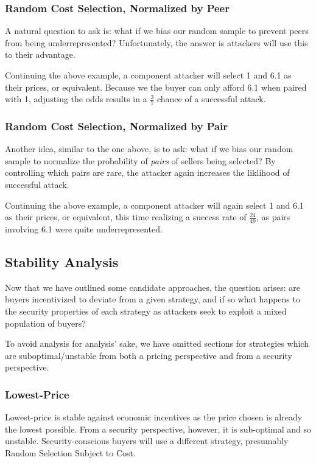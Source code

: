 \subsubsection{Random Cost Selection, Normalized by Peer}

A natural question to ask is: what if we bias our random sample to
prevent peers from being underrepresented? Unfortunately, the answer
is attackers will use this to their advantage.

Continuing the above example, a component attacker will select 1 and
6.1 as their prices, or equivalent. Because we the buyer can only
afford 6.1 when paired with 1, adjusting the odds results in a
$\frac{3}{7}$ chance of a successful attack.

\subsubsection{Random Cost Selection, Normalized by Pair}

Another idea, similar to the one above, is to ask: what if we bias our
random sample to normalize the probability of \emph{pairs} of sellers
being selected? By controlling which pairs are rare, the attacker
again increases the liklihood of successful attack.

Continuing the above example, a component attacker will again select 1
and 6.1 as their prices, or equivalent, this time realizing a success
rate of $\frac{24}{49}$, as pairs involving 6.1 were quite
underrepresented.

\subsection{Stability Analysis}

Now that we have outlined some candidate approaches, the question
arises: are buyers incentivized to deviate from a given strategy, and
if so what happens to the security properties of each strategy as
attackers seek to exploit a mixed population of buyers?

To avoid analysis for analysis' sake, we have omitted sections for
strategies which are suboptimal/unstable from both a pricing
perspective and from a security perspective.

\subsubsection{Lowest-Price}

Lowest-price is stable against economic incentives as the price chosen
is already the lowest possible. From a security perspective, however,
it is sub-optimal and so unstable. Security-conscious buyers will use
a different strategy, presumably Random Selection Subject to Cost.

